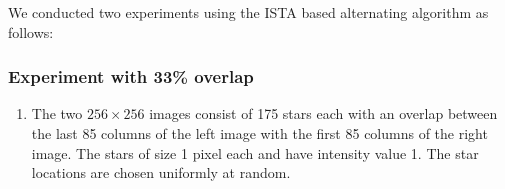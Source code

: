  We conducted two experiments using the ISTA based alternating algorithm as follows:
\subsubsection{Experiment with 33\% overlap}
\begin{enumerate}
\item The two $256 \times 256$ images consist of 175 stars each with an overlap between the last 85 columns of the left image with the first 85 columns of the right image. The stars of size 1 pixel each and have intensity value 1. The star locations are chosen uniformly at random.
\vspace{-0.2in}

\begin{figure}[H]


\end{figure}
\end{enumerate}
